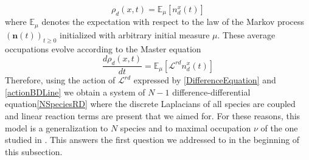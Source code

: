 \documentclass[10pt]{article}
\numberwithin{equation}{section}
\numberwithin{equation}{subsection}
\begin{document}
\begin{equation}
	\rho_{d}(x,t)=\mathbb{E}_{\mu}\left[n_{d}^{x}(t)\right]
\end{equation}
where $\mathbb{E}_{\mu}$ denotes the expectation with respect to the law of the Markov process $(\bm{n}(t))_{t\geq 0}$ initialized with arbitrary initial measure $\mu$. These average occupations evolve according to the Master equation
\begin{equation}
	\frac{d \rho_{d}(x,t)}{dt}=\mathbb{E}_{\mu}\left[\mathcal{L}^{rd}n_{d}^{x}(t)\right]
\end{equation} 
Therefore, using the action of $\mathcal{L}^{rd}$ expressed by \eqref{DifferenceEquation} and \eqref{actionBDLine} we obtain a system of $N-1$ difference-differential equation\eqref{NSpeciesRD} where the discrete Laplacians of all species are coupled and linear reaction terms are present that we aimed for. For these reasons, this model is a generalization to $N$ species and to maximal occupation $\nu$ of the one studied in \cite{casini2022uphill}. This answers the first question we addressed to in the beginning of this subsection. 
\end{document}
